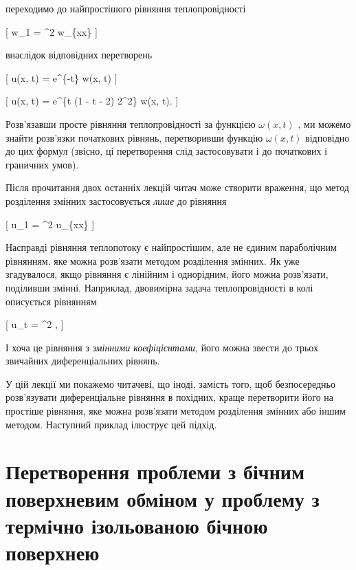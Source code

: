 \documentclass[
  ukrainian,
]{article}
\begin{document}
переходимо до найпростішого рівняння теплопровідності

{[} w\_1 = \alpha\^{}2 w\_\{xx\} {]}

внаслідок відповідних перетворень

{[} u(x, t) = e\^{}\{-\beta t\} w(x, t) {]}

{[} u(x, t) = e\^{}\{\epsilon t (1 - \delta t - 2) 2\alpha\^{}2\} w(x,
t). {]}

Розв'язавши просте рівняння теплопровідності за функцією \(\omega(x,t)\)
, ми можемо знайти розв'язки початкових рівнянь, перетворивши функцію
\(\omega(x,t)\) відповідно до цих формул (звісно, ці перетворення слід
застосовувати і до початкових і граничних умов).

Після прочитання двох останніх лекцій читач може створити враження, що
метод розділення змінних застосовується \emph{лише} до рівняння

{[} u\_1 = \alpha\^{}2 u\_\{xx\} {]}

Насправді рівняння теплопотоку є найпростішим, але не єдиним
параболічним рівнянням, яке можна розв'язати методом розділення змінних.
Як уже згадувалося, якщо рівняння є лінійним і однорідним, його можна
розв'язати, поділивши змінні. Наприклад, двовимірна задача
теплопровідності в колі описується рівнянням

{[} u\_t = \alpha\^{}2
,
{]}

І хоча це рівняння з \emph{змінними коефіцієнтами}, його можна звести до
трьох звичайних диференціальних рівнянь.

У цій лекції ми покажемо читачеві, що іноді, замість того, щоб
безпосередньо розв'язувати диференціальне рівняння в похідних, краще
перетворити його на простіше рівняння, яке можна розв'язати методом
розділення змінних або іншим методом. Наступний приклад ілюструє цей
підхід.

\section{Перетворення проблеми з бічним поверхневим обміном у проблему з
термічно ізольованою бічною
поверхнею}\label{ux43fux435ux440ux435ux442ux432ux43eux440ux435ux43dux43dux44f-ux43fux440ux43eux431ux43bux435ux43cux438-ux437-ux431ux456ux447ux43dux438ux43c-ux43fux43eux432ux435ux440ux445ux43dux435ux432ux438ux43c-ux43eux431ux43cux456ux43dux43eux43c-ux443-ux43fux440ux43eux431ux43bux435ux43cux443-ux437-ux442ux435ux440ux43cux456ux447ux43dux43e-ux456ux437ux43eux43bux44cux43eux432ux430ux43dux43eux44e-ux431ux456ux447ux43dux43eux44e-ux43fux43eux432ux435ux440ux445ux43dux435ux44e}
\end{document}
